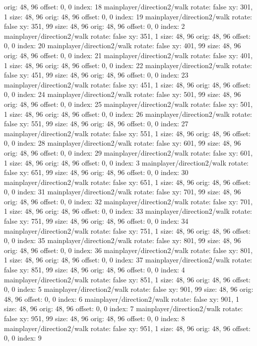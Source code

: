   orig: 48, 96
  offset: 0, 0
  index: 18
mainplayer/direction2/walk
  rotate: false
  xy: 301, 1
  size: 48, 96
  orig: 48, 96
  offset: 0, 0
  index: 19
mainplayer/direction2/walk
  rotate: false
  xy: 351, 99
  size: 48, 96
  orig: 48, 96
  offset: 0, 0
  index: 2
mainplayer/direction2/walk
  rotate: false
  xy: 351, 1
  size: 48, 96
  orig: 48, 96
  offset: 0, 0
  index: 20
mainplayer/direction2/walk
  rotate: false
  xy: 401, 99
  size: 48, 96
  orig: 48, 96
  offset: 0, 0
  index: 21
mainplayer/direction2/walk
  rotate: false
  xy: 401, 1
  size: 48, 96
  orig: 48, 96
  offset: 0, 0
  index: 22
mainplayer/direction2/walk
  rotate: false
  xy: 451, 99
  size: 48, 96
  orig: 48, 96
  offset: 0, 0
  index: 23
mainplayer/direction2/walk
  rotate: false
  xy: 451, 1
  size: 48, 96
  orig: 48, 96
  offset: 0, 0
  index: 24
mainplayer/direction2/walk
  rotate: false
  xy: 501, 99
  size: 48, 96
  orig: 48, 96
  offset: 0, 0
  index: 25
mainplayer/direction2/walk
  rotate: false
  xy: 501, 1
  size: 48, 96
  orig: 48, 96
  offset: 0, 0
  index: 26
mainplayer/direction2/walk
  rotate: false
  xy: 551, 99
  size: 48, 96
  orig: 48, 96
  offset: 0, 0
  index: 27
mainplayer/direction2/walk
  rotate: false
  xy: 551, 1
  size: 48, 96
  orig: 48, 96
  offset: 0, 0
  index: 28
mainplayer/direction2/walk
  rotate: false
  xy: 601, 99
  size: 48, 96
  orig: 48, 96
  offset: 0, 0
  index: 29
mainplayer/direction2/walk
  rotate: false
  xy: 601, 1
  size: 48, 96
  orig: 48, 96
  offset: 0, 0
  index: 3
mainplayer/direction2/walk
  rotate: false
  xy: 651, 99
  size: 48, 96
  orig: 48, 96
  offset: 0, 0
  index: 30
mainplayer/direction2/walk
  rotate: false
  xy: 651, 1
  size: 48, 96
  orig: 48, 96
  offset: 0, 0
  index: 31
mainplayer/direction2/walk
  rotate: false
  xy: 701, 99
  size: 48, 96
  orig: 48, 96
  offset: 0, 0
  index: 32
mainplayer/direction2/walk
  rotate: false
  xy: 701, 1
  size: 48, 96
  orig: 48, 96
  offset: 0, 0
  index: 33
mainplayer/direction2/walk
  rotate: false
  xy: 751, 99
  size: 48, 96
  orig: 48, 96
  offset: 0, 0
  index: 34
mainplayer/direction2/walk
  rotate: false
  xy: 751, 1
  size: 48, 96
  orig: 48, 96
  offset: 0, 0
  index: 35
mainplayer/direction2/walk
  rotate: false
  xy: 801, 99
  size: 48, 96
  orig: 48, 96
  offset: 0, 0
  index: 36
mainplayer/direction2/walk
  rotate: false
  xy: 801, 1
  size: 48, 96
  orig: 48, 96
  offset: 0, 0
  index: 37
mainplayer/direction2/walk
  rotate: false
  xy: 851, 99
  size: 48, 96
  orig: 48, 96
  offset: 0, 0
  index: 4
mainplayer/direction2/walk
  rotate: false
  xy: 851, 1
  size: 48, 96
  orig: 48, 96
  offset: 0, 0
  index: 5
mainplayer/direction2/walk
  rotate: false
  xy: 901, 99
  size: 48, 96
  orig: 48, 96
  offset: 0, 0
  index: 6
mainplayer/direction2/walk
  rotate: false
  xy: 901, 1
  size: 48, 96
  orig: 48, 96
  offset: 0, 0
  index: 7
mainplayer/direction2/walk
  rotate: false
  xy: 951, 99
  size: 48, 96
  orig: 48, 96
  offset: 0, 0
  index: 8
mainplayer/direction2/walk
  rotate: false
  xy: 951, 1
  size: 48, 96
  orig: 48, 96
  offset: 0, 0
  index: 9

